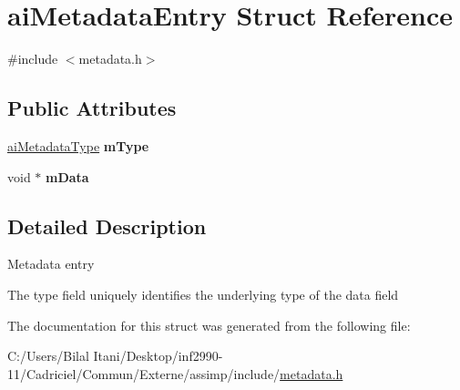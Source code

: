 \hypertarget{structai_metadata_entry}{}\section{ai\+Metadata\+Entry Struct Reference}
\label{structai_metadata_entry}


{\ttfamily \#include $<$metadata.\+h$>$}

\subsection*{Public Attributes}
\begin{DoxyCompactItemize}
\item 
\hyperlink{metadata_8h_aa910906c37416da57bb36335a4d04232}{ai\+Metadata\+Type} {\bfseries m\+Type}\hypertarget{structai_metadata_entry_a075b29cd710e153f5402f479a7a10aee}{}\label{structai_metadata_entry_a075b29cd710e153f5402f479a7a10aee}

\item 
void $\ast$ {\bfseries m\+Data}\hypertarget{structai_metadata_entry_a97fe80a47846374edd38bda5b50b99b3}{}\label{structai_metadata_entry_a97fe80a47846374edd38bda5b50b99b3}

\end{DoxyCompactItemize}


\subsection{Detailed Description}
Metadata entry

The type field uniquely identifies the underlying type of the data field 

The documentation for this struct was generated from the following file\+:\begin{DoxyCompactItemize}
\item 
C\+:/\+Users/\+Bilal Itani/\+Desktop/inf2990-\/11/\+Cadriciel/\+Commun/\+Externe/assimp/include/\hyperlink{metadata_8h}{metadata.\+h}\end{DoxyCompactItemize}
